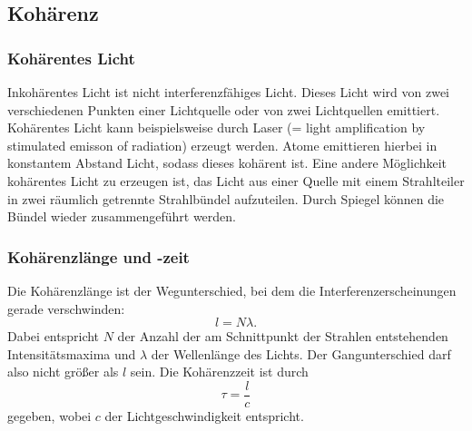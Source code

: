 \subsection{Kohärenz}
\subsubsection{Kohärentes Licht}
Inkohärentes Licht ist nicht interferenzfähiges Licht. Dieses Licht wird von zwei
verschiedenen Punkten einer Lichtquelle oder von zwei Lichtquellen emittiert.
\newline
Kohärentes Licht kann beispielsweise durch Laser (= light amplification by stimulated emisson of radiation)
erzeugt werden. Atome emittieren hierbei in konstantem Abstand Licht, sodass dieses 
kohärent ist.
\newline
Eine andere Möglichkeit kohärentes Licht zu erzeugen ist, das Licht aus einer Quelle
mit einem Strahlteiler in zwei räumlich getrennte Strahlbündel aufzuteilen.
Durch Spiegel können die Bündel wieder zusammengeführt werden.

\subsubsection{Kohärenzlänge und -zeit}
Die Kohärenzlänge ist der Wegunterschied, bei dem die Interferenzerscheinungen
gerade verschwinden:
\begin{equation*}
    l = N \lambda.
\end{equation*}
Dabei entspricht $N$ der Anzahl der am Schnittpunkt der Strahlen entstehenden Intensitätsmaxima 
und $\lambda$ der Wellenlänge des Lichts. 
Der Gangunterschied darf also nicht größer als $l$ sein.
\newline
Die Kohärenzzeit ist durch
\begin{equation*}
    \tau = \frac{l}{c}
\end{equation*}
gegeben, wobei $c$ der Lichtgeschwindigkeit entspricht.

